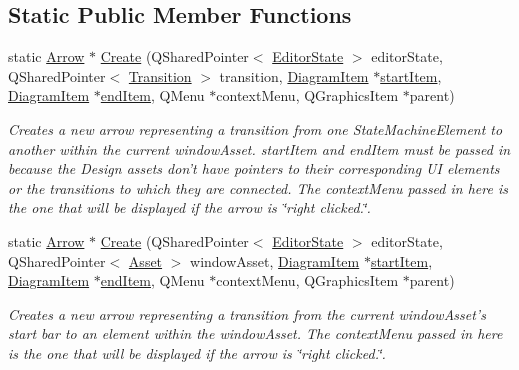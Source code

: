 \subsection*{Static Public Member Functions}
\begin{DoxyCompactItemize}
\item 
static \hyperlink{class_arrow}{Arrow} $\ast$ \hyperlink{class_arrow_aad0a27ad145b1ffec4a07a75e7e6cf0c}{Create} (Q\-Shared\-Pointer$<$ \hyperlink{class_editor_state}{Editor\-State} $>$ editor\-State, Q\-Shared\-Pointer$<$ \hyperlink{class_picto_1_1_transition}{Transition} $>$ transition, \hyperlink{class_diagram_item}{Diagram\-Item} $\ast$\hyperlink{class_arrow_aca1c4bf8681a1449b8e09af3dac9b797}{start\-Item}, \hyperlink{class_diagram_item}{Diagram\-Item} $\ast$\hyperlink{class_arrow_a363d170cfcc7db0472843a93de7e86d4}{end\-Item}, Q\-Menu $\ast$context\-Menu, Q\-Graphics\-Item $\ast$parent)
\begin{DoxyCompactList}\small\item\em Creates a new arrow representing a transition from one State\-Machine\-Element to another within the current window\-Asset. start\-Item and end\-Item must be passed in because the Design assets don't have pointers to their corresponding U\-I elements or the transitions to which they are connected. The context\-Menu passed in here is the one that will be displayed if the arrow is \char`\"{}right clicked.\char`\"{}. \end{DoxyCompactList}\item 
static \hyperlink{class_arrow}{Arrow} $\ast$ \hyperlink{class_arrow_afb573565da5d0d13c13bfbe662cc5aa1}{Create} (Q\-Shared\-Pointer$<$ \hyperlink{class_editor_state}{Editor\-State} $>$ editor\-State, Q\-Shared\-Pointer$<$ \hyperlink{class_picto_1_1_asset}{Asset} $>$ window\-Asset, \hyperlink{class_diagram_item}{Diagram\-Item} $\ast$\hyperlink{class_arrow_aca1c4bf8681a1449b8e09af3dac9b797}{start\-Item}, \hyperlink{class_diagram_item}{Diagram\-Item} $\ast$\hyperlink{class_arrow_a363d170cfcc7db0472843a93de7e86d4}{end\-Item}, Q\-Menu $\ast$context\-Menu, Q\-Graphics\-Item $\ast$parent)
\begin{DoxyCompactList}\small\item\em Creates a new arrow representing a transition from the current window\-Asset's start bar to an element within the window\-Asset. The context\-Menu passed in here is the one that will be displayed if the arrow is \char`\"{}right clicked.\char`\"{}. \end{DoxyCompactList}\end{DoxyCompactItemize}
